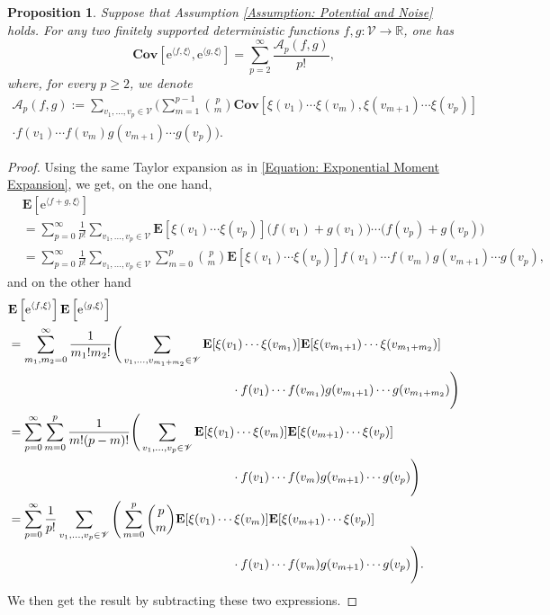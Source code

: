 \documentclass{amsart}
\numberwithin{equation}{section}
\newtheorem{proposition}[theorem]{Proposition}
\theoremstyle{definition}
\newcommand\mbb{\mathbb}
\newcommand\mbf{\mathbf}
\newcommand\mc{\mathcal}
\newcommand\mr{\mathrm}
\newcommand\ms{\mathscr}
\begin{document}
\begin{proposition}
	\label{Proposition: General Covariance Formula}
	Suppose that Assumption \ref{Assumption: Potential and Noise} holds.
	For any two finitely supported deterministic functions $f,g:\ms V\to\mbb R$,
	one has
	\[\mbf{Cov}\left[\mr e^{\langle f,\xi\rangle},\mr e^{\langle g,\xi\rangle}\right]=\sum_{p=2}^\infty\frac{\mc A_p(f,g)}{p!},\]
	where, for every $p\geq2$, we denote
	\begin{multline}
		\label{Equation: General Covariance Formula}
		\mc A_p(f,g):=
		\sum_{v_1,\ldots,v_p\in\ms V}\Bigg(\sum_{m=1}^{p-1}{p\choose m}
		\mbf{Cov}[\xi(v_1)\cdots\xi(v_m),\xi(v_{m+1})\cdots\xi(v_p)]\\
		\cdot f(v_1)\cdots f(v_m)g(v_{m+1})\cdots g(v_p)\Bigg).
	\end{multline}
\end{proposition}
\begin{proof}
	Using the same Taylor expansion as in \eqref{Equation: Exponential Moment Expansion},
	we get, on the one hand,
	\begin{align*}
		&\mbf E\left[\mr e^{\langle f+g,\xi\rangle}\right]\\
		&=\sum_{p=0}^\infty\frac{1}{p!}\sum_{v_1,\ldots,v_p\in\ms V}\mbf E[\xi(v_1)\cdots\xi(v_p)]\big(f(v_1)+g(v_1)\big)\cdots\big(f(v_p)+g(v_p)\big)\\
		&=\sum_{p=0}^\infty\frac{1}{p!}\sum_{v_1,\ldots,v_p\in\ms V}\sum_{m=0}^p{p\choose m}\mbf E[\xi(v_1)\cdots\xi(v_p)]f(v_1)\cdots f(v_m)g(v_{m+1})\cdots g(v_p),
	\end{align*}
	and on the other hand
	\begin{align*}
		&\mbf E\left[\mr e^{\langle f,\xi\rangle}\right]\mbf E\left[\mr e^{\langle g,\xi\rangle}\right]\\
		&=\sum_{m_1,m_2=0}^\infty\frac{1}{m_1!m_2!}\Bigg(\sum_{v_1,\ldots,v_{m_1+m_2}\in\ms V}
		\mbf E[\xi(v_1)\cdots\xi(v_{m_1})]\mbf E[\xi(v_{m_1+1})\cdots\xi(v_{m_1+m_2})]\\
		&\hspace{2.5in}\cdot f(v_1)\cdots f(v_{m_1})g(v_{m_1+1})\cdots g(v_{m_1+m_2})\Bigg)\\
		&=\sum_{p=0}^\infty\sum_{m=0}^p\frac{1}{m!(p-m)!}\Bigg(\sum_{v_1,\ldots,v_{p}\in\ms V}
		\mbf E[\xi(v_1)\cdots\xi(v_{m})]\mbf E[\xi(v_{m+1})\cdots\xi(v_{p})]\\
		&\hspace{2.5in}\cdot f(v_1)\cdots f(v_{m})g(v_{m+1})\cdots g(v_{p})\Bigg)\\
		&=\sum_{p=0}^\infty\frac1{p!}\sum_{v_1,\ldots,v_{p}\in\ms V}\Bigg(\sum_{m=0}^p{p\choose m}
		\mbf E[\xi(v_1)\cdots\xi(v_{m})]\mbf E[\xi(v_{m+1})\cdots\xi(v_{p})]\\
		&\hspace{2.5in}\cdot f(v_1)\cdots f(v_{m})g(v_{m+1})\cdots g(v_{p})\Bigg).
	\end{align*}
	We then get the result by subtracting these two expressions.
\end{proof}
%
\end{document}
